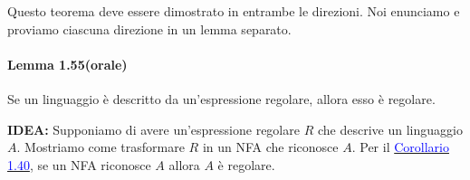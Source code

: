 \documentclass{article}
\begin{document}
Questo teorema deve essere dimostrato in entrambe le direzioni. Noi enunciamo e proviamo ciascuna direzione in un lemma separato.

\paragraph{Lemma 1.55(orale)}
\text{  }
\begin{tcolorbox}[colback=orange!10!white, colframe=orange!50!black, title=Lemma 1.55 (orale)]
    Se un linguaggio è descritto da un'espressione regolare, allora esso è regolare.
\end{tcolorbox}

\textbf{IDEA:}
Supponiamo di avere un'espressione regolare $R$ che descrive un linguaggio $A$. Mostriamo come trasformare $R$ in un NFA che riconosce $A$.
Per il \hyperref[corollario-1.40]{\textcolor{blue}{Corollario 1.40}}, se un NFA riconosce $A$ allora $A$ è regolare.
\vspace{1em}
\end{document}
